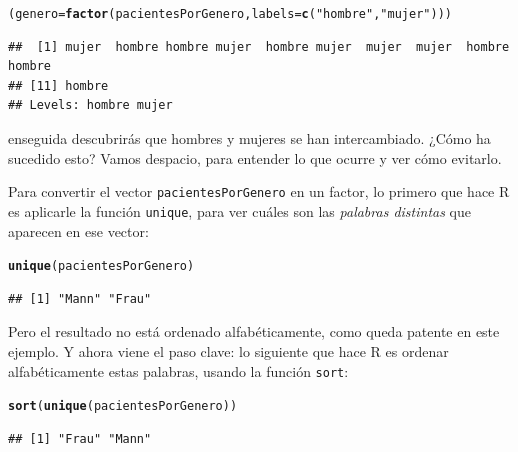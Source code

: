 \documentclass[10pt,a4paper]{article}\usepackage[]{graphicx}\usepackage[]{color}
\makeatletter
\newcommand{\hlstr}[1]{\textcolor[rgb]{0.192,0.494,0.8}{#1}}%
\newcommand{\hlstd}[1]{\textcolor[rgb]{0.345,0.345,0.345}{#1}}%
\newcommand{\hlkwb}[1]{\textcolor[rgb]{0.69,0.353,0.396}{#1}}%
\newcommand{\hlkwc}[1]{\textcolor[rgb]{0.333,0.667,0.333}{#1}}%
\newcommand{\hlkwd}[1]{\textcolor[rgb]{0.737,0.353,0.396}{\textbf{#1}}}%
\newenvironment{kframe}{%
 \def\at@end@of@kframe{}%
 \ifinner\ifhmode%
  \def\at@end@of@kframe{\end{minipage}}%
  \begin{minipage}{\columnwidth}%
 \fi\fi%
 \def\FrameCommand##1{\hskip\@totalleftmargin \hskip-\fboxsep
 \colorbox{shadecolor}{##1}\hskip-\fboxsep
     \hskip-\linewidth \hskip-\@totalleftmargin \hskip\columnwidth}%
 \MakeFramed {\advance\hsize-\width
   \@totalleftmargin\z@ \linewidth\hsize
   \@setminipage}}%
 {\par\unskip\endMakeFramed%
 \at@end@of@kframe}
\newenvironment{knitrout}{}{} %
\makeatother
\begin{document}
\begin{knitrout}
\color{fgcolor}\begin{kframe}
\begin{alltt}
\hlstd{(genero} \hlkwb{=} \hlkwd{factor}\hlstd{(pacientesPorGenero,} \hlkwc{labels}\hlstd{=}\hlkwd{c}\hlstd{(}\hlstr{"hombre"}\hlstd{,} \hlstr{"mujer"}\hlstd{)))}
\end{alltt}
\begin{verbatim}
##  [1] mujer  hombre hombre mujer  hombre mujer  mujer  mujer  hombre hombre
## [11] hombre
## Levels: hombre mujer
\end{verbatim}
\end{kframe}
\end{knitrout}
enseguida descubrirás que hombres y mujeres se han intercambiado. ¿Cómo ha sucedido esto? Vamos despacio, para entender lo que ocurre y ver cómo evitarlo.


Para convertir el vector {\tt pacientesPorGenero} en un factor, lo primero que hace R es aplicarle la función {\tt unique}, para ver cuáles son las {\em palabras distintas} que aparecen en ese vector:

\begin{knitrout}
\color{fgcolor}\begin{kframe}
\begin{alltt}
\hlkwd{unique}\hlstd{(pacientesPorGenero)}
\end{alltt}
\begin{verbatim}
## [1] "Mann" "Frau"
\end{verbatim}
\end{kframe}
\end{knitrout}

Pero el resultado no está ordenado alfabéticamente, como queda patente en este ejemplo. Y ahora viene el paso clave: lo siguiente que hace R es ordenar alfabéticamente estas palabras, usando la función {\tt sort}:

\begin{knitrout}
\color{fgcolor}\begin{kframe}
\begin{alltt}
\hlkwd{sort}\hlstd{(}\hlkwd{unique}\hlstd{(pacientesPorGenero))}
\end{alltt}
\begin{verbatim}
## [1] "Frau" "Mann"
\end{verbatim}
\end{kframe}
\end{knitrout}
\end{document}
